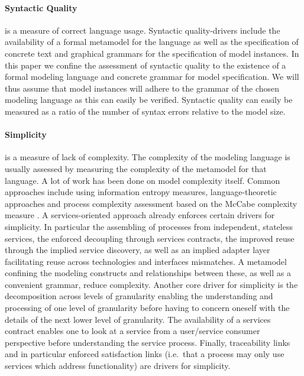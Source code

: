 \paragraph{Syntactic Quality} is a measure of correct language usage. Syntactic quality-drivers include the availability of a formal metamodel for the language as well as the specification of concrete text and graphical grammars for the specification of model instances. In this paper we confine the assessment of syntactic quality to the existence of a formal modeling language and concrete grammar for model specification. We will thus assume that model instances will adhere to the grammar of the chosen modeling language as this can easily be verified. Syntactic quality can easily be measured as a ratio of the number of syntax errors relative to the model size.

\paragraph{Simplicity} is a measure of lack of complexity. The complexity of the modeling language is usually assessed by measuring the complexity of the metamodel for that language\cite{mohagheghi_evaluating_2007}. A lot of work has been done on model complexity itself. Common approaches include using information entropy measures\cite{abrahamsson_extreme_2004}, language-theoretic approaches\cite{podgorelec_estimating_2007} and process complexity assessment based on the McCabe complexity measure \cite{mccabe_complexity_1976}. A services-oriented approach already enforces certain drivers for simplicity. In particular the assembling of processes from independent, stateless services, the enforced decoupling through services contracts, the improved reuse through the implied service discovery, as well as an implied adapter layer facilitating reuse across technologies and interfaces mismatches. A metamodel confining the modeling constructs and relationships between these, as well as a convenient grammar, reduce complexity. Another core driver for simplicity is the decomposition across levels of granularity enabling the understanding and processing of one level of granularity before having to concern oneself with the details of the next lower level of granularity. The availability of a services contract enables one to look at a service from a user/service consumer perspective before understanding the service process. Finally, traceability links and in particular enforced satisfaction links (i.e.\ that a process may only use services which address functionality) are drivers for simplicity.

